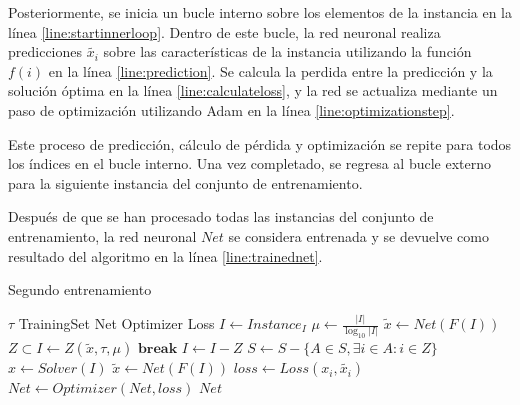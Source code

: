 \documentclass[spanish, a4paper, 12pt, openany,final]{book}
\begin{document}
Posteriormente, se inicia un bucle interno sobre los elementos de la instancia en la línea \ref{line:startinnerloop}. Dentro de este bucle, la red neuronal realiza predicciones $\tilde{x_i}$ sobre las características de la instancia utilizando la función \(f(i)\) en la línea \ref{line:prediction}. Se calcula la perdida entre la predicción y la solución óptima en la línea \ref{line:calculateloss}, y la red se actualiza mediante un paso de optimización utilizando Adam en la línea \ref{line:optimizationstep}.

Este proceso de predicción, cálculo de pérdida y optimización se repite para todos los índices en el bucle interno. Una vez completado, se regresa al bucle externo para la siguiente instancia del conjunto de entrenamiento.

Después de que se han procesado todas las instancias del conjunto de entrenamiento, la red neuronal $Net$ se considera entrenada y se devuelve como resultado del algoritmo en la línea \ref{line:trainednet}.




\begin{algorithm}[H]
	\caption{Segundo entrenamiento}\label{alg:tunning}
	\begin{algorithmic}[1]
		\State $\tau$ \label{alg1:def_tau_2} 
		\State TrainingSet 
		\State Net 
		\State Optimizer 
		\State Loss \label{line:alg2:loss}
				\State $I \gets Instance_I $
				\Loop {}
				\State $\mu \gets \frac{|I|}{\log_{10}{|I|}}$ \label{alg2:def_mu} 
					\State $\tilde{x} \gets Net(F(I))$   \label{line:alg2:initial_pred}
					\State $Z \subset I \gets Z(\tilde{x},\tau,\mu)$ \label{start_reduction_alg}
						\State $\textbf{break}$ 
					\EndIf
					\State $I \gets I-Z$  \label{alg1:update_I_2}
					\State $S \gets S - \{A \in S, \exists i \in A: i \in Z\}$  \label{end_reduction_alg}
				\State $x \gets Solver(I)$   \label{solve_smaller}
				\State $\tilde{x} \gets Net(F(I))$  \label{pred_smaller}
				\State $loss \gets Loss(x_i,\tilde{x_i})$      \label{smaller_loss}
				\State $Net \gets Optimizer(Net,loss)$		   \label{smaller_optim}
			\EndFor
			\EndLoop
		\EndFor
		\State $Net$ 
	\end{algorithmic}
\end{algorithm}
\end{document}
